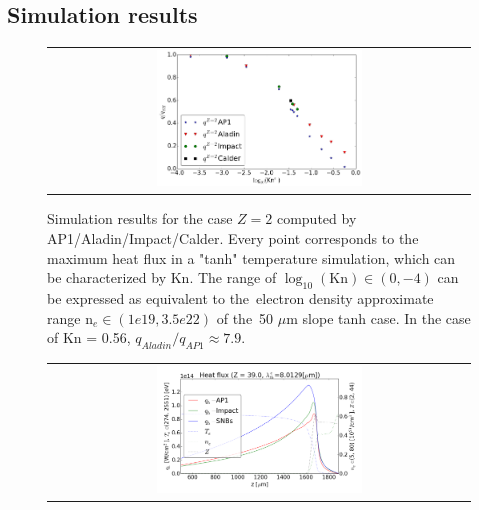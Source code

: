 \subsection{Simulation results}
\label{sec:SimulationResults}

\begin{figure}[tbh]
  \begin{center}
    \begin{tabular}{c}
      \includegraphics[width=0.5\textwidth]{Kn_results.png}
    \end{tabular}
  \caption{  
  Simulation results for the case $Z=2$ computed by AP1/Aladin/Impact/Calder.
  Every point corresponds to the maximum heat flux in a "tanh" temperature 
  simulation, which can be characterized by Kn. The range of 
  $\log_{10}(\text{Kn})\in (0, -4)$ can be expressed as equivalent 
  to the~electron density approximate range n$_e \in (1e19, 3.5e22)$ of 
  the~50 $\mu$m slope tanh case. In the case of Kn = 0.56, 
  $q_{Aladin} / q_{AP1}\approx 7.9$.}
  \end{center}
  \label{fig:q1s_summary}
\end{figure}

\begin{figure}[tbh]
  \begin{center}
    \begin{tabular}{c}
      \includegraphics[width=0.5\textwidth]{../VFPdata/GD_Hohlraum/fluxes_10ps.png} 
    \end{tabular}
  \caption{
  }
  \end{center}
  \label{fig:Gd_VFP_10ps_heatflux}
\end{figure}
